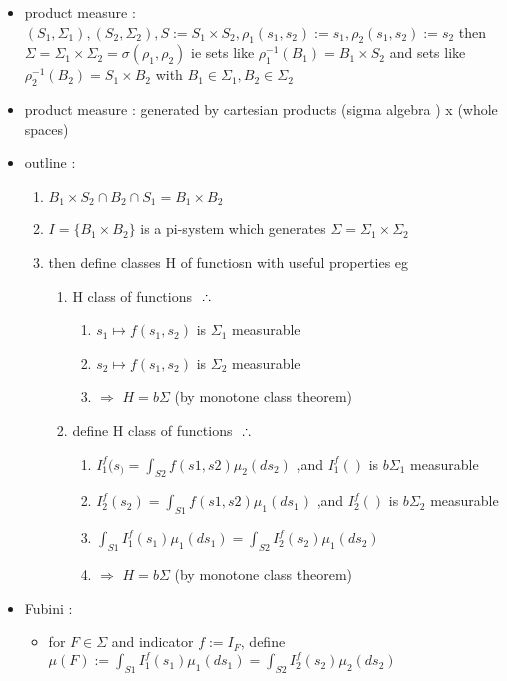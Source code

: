 \documentclass[10pt,landscape,a4paper]{article}
\begin{document}
\begin{multicols*}{3}
\begin{spacing}{0.5}
\begin{itemize}
\item product measure : $(S_1,\Sigma_1),(S_2,\Sigma_2),S:=S_1 \times S_2, \rho_1(s_1,s_2):=s_1,\rho_2(s_1,s_2):=s_2$ then $\Sigma=\Sigma_1 \times \Sigma_2=\sigma(\rho_1,\rho_2)$ ie sets like $\rho_1^{-1}(B_1)= B_1 \times S_2$ and sets like $\rho_2^{-1}(B_2)= S_1 \times B_2$  with $B_1 \in \Sigma_1, B_2 \in \Sigma_2$
\item product measure : generated by cartesian products (sigma algebra ) x (whole spaces)
\item  outline : 
\begin{enumerate}
\item $B_1 \times S_2 \cap B_2 \cap S_1 = B_1 \times B_2$
\item $I=\{B_1 \times B_2\}$ is a pi-system which generates $\Sigma = \Sigma_1 \times \Sigma_2 $
\item then define classes H of functiosn with useful properties eg
\begin{enumerate}
\item H class of functions $\sucht$
\begin{enumerate}
\item ${ s_1 \mapsto f(s_1,s_2)}$ is $\Sigma_1$ measurable
\item ${ s_2 \mapsto f(s_1,s_2)}$ is $\Sigma_2$ measurable 
\item $\Rightarrow$ $H=b\Sigma$ (by monotone class theorem)
\end{enumerate}
\item define H class of functions $\sucht$
\begin{enumerate}
\item  $I_1^f(s_)=\int_{S2}f(s1,s2)\mu_2(ds_2)$ ,and $I_1^f()$ is $b\Sigma_1$ measurable
\item $I_2^f(s_2)=\int_{S1}f(s1,s2)\mu_1(ds_1)$ ,and $I_2^f()$ is $b\Sigma_2$ measurable
\item $\int_{S1}I_1^f(s_1)\mu_1(ds_1) = \int_{S2}I_2^f(s_2)\mu_1(ds_2)$
\item $\Rightarrow$ $H=b\Sigma$ (by monotone class theorem)
\end{enumerate}
\end{enumerate}
\end{enumerate}

\item \colorbox{green!10}{Fubini} : 
\begin{itemize}

\item  for $F \in \Sigma$ and indicator $f:=I_F$, define $\mu(F) := \int_{S1}I_1^f(s_1)\mu_1(ds_1) = \int_{S2}I_2^f(s_2)\mu_2(ds_2) $


\end{itemize}
\end{itemize}
\end{spacing}
\end{multicols*}
\end{document}
